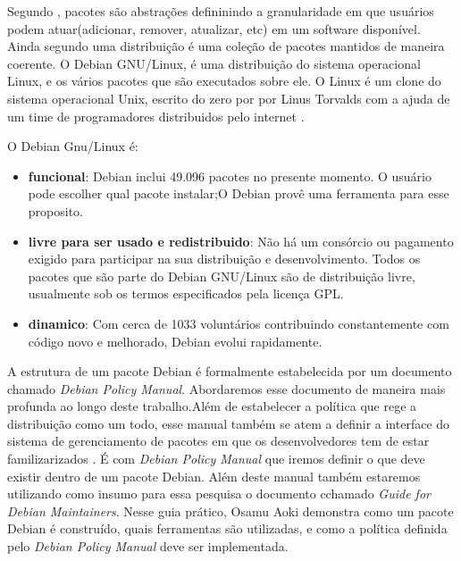 
Segundo \cite{Zacchiroli}, pacotes são abstrações defininindo a granularidade em que usuários podem atuar(adicionar, remover, atualizar, etc) em um software disponível. Ainda
segundo \cite{Zacchiroli} uma distribuição é uma coleção de pacotes mantidos de maneira coerente.
O Debian GNU/Linux, é uma distribuição do sistema operacional Linux, e os vários pacotes que são executados sobre ele\cite{Debian}.
O Linux é um clone do sistema operacional Unix, escrito do zero por por Linus Torvalds com a ajuda de um time de programadores distribuidos pelo internet \cite{Linux}.

O Debian Gnu/Linux é:
        \begin{itemize}
        \item \textbf{funcional}: Debian inclui 49.096 pacotes no presente momento. O usuário
        pode escolher qual pacote instalar;O Debian provê uma ferramenta para esse proposito.\cite{Debian}

        \item \textbf{livre para ser usado e redistribuido}: Não há um consórcio ou pagamento exigido para participar na sua distribuição e desenvolvimento.
        Todos os pacotes que são parte do Debian GNU/Linux são de distribuição livre, usualmente sob os termos especificados pela licença GPL.\cite{Debian}

        \item \textbf{dinamico}: Com cerca de 1033 voluntários contribuindo constantemente com código novo e melhorado, Debian evolui rapidamente.\cite{Debian}
        \end{itemize}


        A estrutura de um pacote Debian é formalmente estabelecida por um documento chamado \textit {Debian Policy Manual}. Abordaremos esse documento de maneira mais profunda ao longo deste trabalho.Além de estabelecer a política que rege a distribuição como um todo,  esse manual também se atem a definir a interface do sistema de gerenciamento de pacotes em que os desenvolvedores tem de estar familizarizados \cite{Guide}. É com \textit {Debian Policy Manual} que iremos definir o que deve existir dentro de um pacote Debian. Além deste manual também estaremos utilizando como insumo para essa pesquisa o documento cchamado \textit{Guide for Debian Maintainers}. Nesse guia prático, Osamu Aoki demonstra como um pacote Debian é construído, quais ferramentas são utilizadas, e como a política definida pelo \textit{Debian Policy Manual} deve ser implementada.


